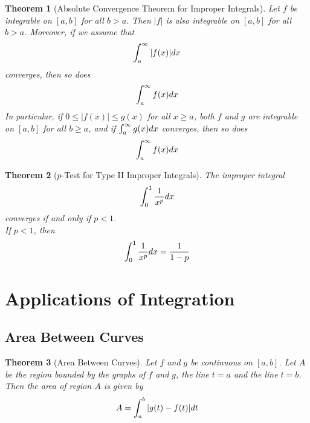 \documentclass[10pt]{article}
\theoremstyle{break}
\newtheorem{thm}{Theorem}[subsection]
\begin{document}
\begin{thm}[Absolute Convergence Theorem for Improper Integrals]
    Let $f$ be integrable on $[a,b]$ for all $b > a$. Then $|f|$ is also integrable on $[a,b]$ for all $b > a$. Moreover, if we assume that $$\int^\infty_a |f(x)|\space dx$$ converges, then so does $$\int^\infty_a f(x) \space dx$$ In particular, if $0 \le |f(x)| \le g(x)$ for all $x \ge a$, both $f$ and $g$ are integrable on $[a,b]$ for all $b \ge a$, and if  $\int^\infty_a g(x) \space dx$ converges, then so does $$\int^\infty_a f(x) \space dx$$
\end{thm}
\begin{thm}[$p$-Test for Type II Improper Integrals]
    The improper integral $$\int^1_0 \dfrac{1}{x^p} \space dx$$ converges if and only if $p < 1$. \\If $p < 1$, then $$\int^1_0 \dfrac{1}{x^p} \space dx = \dfrac{1}{1 - p}$$
\end{thm}



\newpage




\section{Applications of Integration}
\subsection{Area Between Curves}
\begin{thm}[Area Between Curves]
    Let $f$ and $g$ be continuous on $[a,b]$. Let $A$ be the region bounded by the graphs of $f$ and $g$, the line $t = a$ and the line $t = b$. Then the area of region $A$ is given by $$A = \int^b_a |g(t) - f(t)|\space dt$$
\end{thm}
\end{document}

